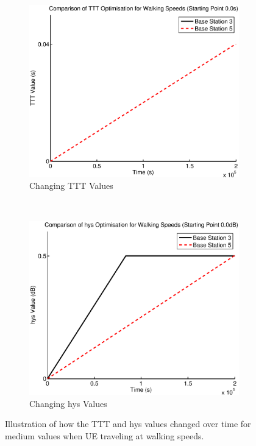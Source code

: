 \begin{figure}[H]
        \centering
        \begin{subfigure}[b]{0.49\textwidth}
                \includegraphics[width=\textwidth]{figures/walking_figures/low/long_ttt.eps}
                \caption{Changing TTT Values}
                \label{fig:walk_low_ttt}
        \end{subfigure}%
        ~ %
        \begin{subfigure}[b]{0.49\textwidth}
                \includegraphics[width=\textwidth]{figures/walking_figures/low/long_hys.eps}
                \caption{Changing hys Values}
                \label{fig:walk_low_hys}
        \end{subfigure}
        \caption{Illustration of how the TTT and hys values changed over time for medium values when UE traveling at walking speeds.}\label{fig:walk_low_ttthys}
\end{figure}
